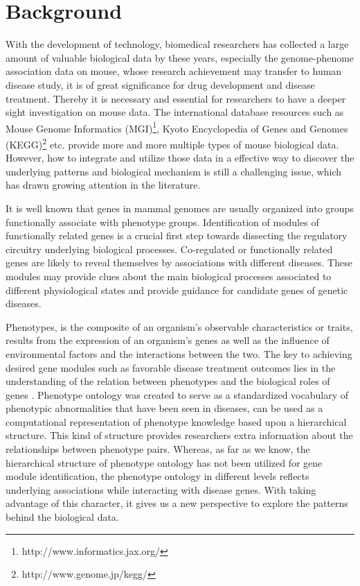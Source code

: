 \documentclass{bmcart}
\begin{document}
\section*{Background}
With the development of technology, biomedical researchers has collected a large amount of valuable biological data by these years, especially the genome-phenome association data on mouse, whose research achievement may transfer to human disease study, it is of great significance for drug development and disease treatment. Thereby it is necessary and essential for researchers to have a deeper sight investigation on mouse data. The international database resources such as Mouse Genome Informatics (MGI)\footnote{http://www.informatics.jax.org/}, Kyoto Encyclopedia of Genes and Genomes (KEGG)\footnote{http://www.genome.jp/kegg/} etc. provide more and more multiple types of mouse biological data. However, how to integrate and utilize those data in a effective way to discover the underlying patterns and biological mechanism is still a challenging issue, which has drawn growing attention in the literature.

It is well known that genes in mammal genomes are usually organized into groups functionally associate with phenotype groups\cite{XuanH2015,Yao2011,Lage2007,Oti2006}. Identification of modules of functionally related genes is a crucial first step towards dissecting the regulatory circuitry underlying biological processes. Co-regulated or functionally related genes are likely to reveal themselves by associations with different diseases. These modules may provide clues about the main biological processes associated to different physiological states and provide guidance for candidate genes of genetic diseases.

Phenotypes, is the composite of an organism's observable characteristics or traits, results from the expression of an organism's genes as well as the influence of environmental factors and the interactions between the two\cite{McKusick2007,PhilipGroth2006}. The key to achieving desired gene modules such as favorable disease treatment outcomes lies in the understanding of the relation between phenotypes and the biological roles of genes \cite{Sawyers2008,Rubin2008,Edwards2004}. Phenotype ontology was created to serve as a standardized vocabulary of phenotypic abnormalities that have been seen in diseases, can be used as a computational representation of phenotype knowledge based upon a hierarchical structure\cite{Robinson2014,Kohler2014,Smith2009}. This kind of structure provides researchers extra information about the relationships between phenotype pairs. Whereas, as far as we know, the hierarchical structure of phenotype ontology has not been utilized for gene module identification, the phenotype ontology in different levels reflects underlying associations while interacting with disease genes. With taking advantage of this character, it gives us a new perspective to explore the patterns behind the biological data.
\end{document}
